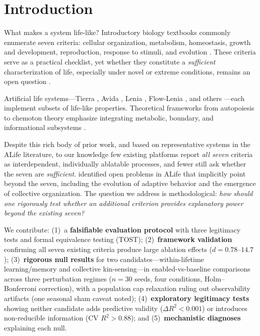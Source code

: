 \documentclass[letterpaper]{article}
\begin{document}
\section{Introduction}

What makes a system life-like?  Introductory biology textbooks
commonly enumerate seven criteria: cellular organization, metabolism,
homeostasis, growth and development, reproduction, response to stimuli,
and evolution \citep{urry_2020_campbell}.  These criteria serve as a
practical checklist, yet whether they constitute a \emph{sufficient}
characterization of life, especially under novel or extreme
conditions, remains an open question
\citep{cleland_2002_defining, benner_2010_defining}.

Artificial life systems---Tierra \citep{ray_1991_approach},
Avida \citep{ofria_2004_avida}, Lenia \citep{chan_2019_lenia},
Flow-Lenia \citep{plantec_2023_flow}, and others
\citep{yaeger_1994_computational, heinemann_2008_alien,
barbieux_2024_coralai}---each implement subsets of life-like properties.
Theoretical frameworks from autopoiesis
\citep{maturana_1980_autopoiesis} to chemoton theory
\citep{ganti_2003_principles} emphasize integrating metabolic,
boundary, and informational subsystems \citep{ruizmirazo_2004_universal}.

Despite this rich body of prior work, and based on representative systems
in the ALife literature, to our knowledge few existing platforms report
\emph{all seven} criteria as interdependent, individually ablatable
processes, and fewer still ask whether the seven are \emph{sufficient}.
\citet{bedau_2000_open} identified open problems in ALife that implicitly
point beyond the seven, including the evolution of adaptive behavior
and the emergence of collective organization.
The question we address is methodological: \emph{how should one
rigorously test whether an additional criterion provides explanatory
power beyond the existing seven?}

We contribute:
(1)~a \textbf{falsifiable evaluation protocol} with three legitimacy tests
and formal equivalence testing (TOST);
(2)~\textbf{framework validation} confirming all seven existing criteria
produce large ablation effects ($d = 0.78$--$14.7$);
(3)~\textbf{rigorous null results} for two candidates---within-lifetime
learning/memory and collective kin-sensing---in enabled-vs-baseline
comparisons across three perturbation regimes ($n=30$ seeds, four
conditions, Holm--Bonferroni correction), with a population cap
relaxation ruling out observability artifacts (one seasonal sham caveat
noted);
(4)~\textbf{exploratory legitimacy tests} showing neither candidate adds
predictive validity ($\Delta R^2 < 0.001$) or introduces non-reducible
information (CV $R^2 > 0.88$); and
(5)~\textbf{mechanistic diagnoses} explaining each null.
\end{document}

